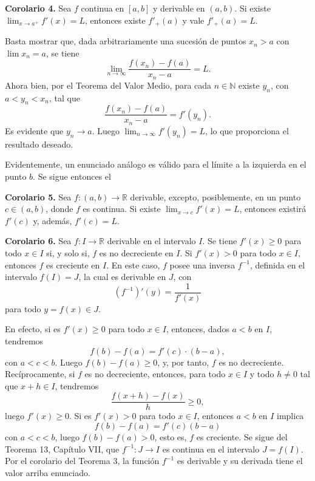 \documentclass[12pt,oneside]{book}
\begin{document}
\textbf{Corolario 4.} Sea \( f \) continua en \( [a, b] \) y derivable en \( (a, b) \). Si existe \( \lim_{x \to a^+} f'(x) = L \), entonces existe \( f'_+(a) \) y vale \( f'_+(a) = L \).

Basta mostrar que, dada arbitrariamente una sucesión de puntos \( x_n > a \) con \( \lim x_n = a \), se tiene
\[
\lim_{n \to \infty} \frac{f(x_n) - f(a)}{x_n - a} = L.
\]
Ahora bien, por el Teorema del Valor Medio, para cada \( n \in \mathbb{N} \) existe \( y_n \), con \( a < y_n < x_n \), tal que
\[
\frac{f(x_n) - f(a)}{x_n - a} = f'(y_n).
\]
Es evidente que \( y_n \to a \). Luego \( \lim_{n \to \infty} f'(y_n) = L \), lo que proporciona el resultado deseado.

Evidentemente, un enunciado análogo es válido para el límite a la izquierda en el punto \( b \). Se sigue entonces el

\textbf{Corolario 5.} Sea \( f: (a, b) \to \mathbb{R} \) derivable, excepto, posiblemente, en un punto \( c \in (a, b) \), donde \( f \) es continua. Si existe \( \lim_{x \to c} f'(x) = L \), entonces existirá \( f'(c) \) y, además, \( f'(c) = L \).

\textbf{Corolario 6.} Sea \( f: I \to \mathbb{R} \) derivable en el intervalo \( I \). Se tiene \( f'(x) \geq 0 \) para todo \( x \in I \) si, y solo si, \( f \) es no decreciente en \( I \). Si \( f'(x) > 0 \) para todo \( x \in I \), entonces \( f \) es creciente en \( I \). En este caso, \( f \) posee una inversa \( f^{-1} \), definida en el intervalo \( f(I) = J \), la cual es derivable en \( J \), con
\[
(f^{-1})'(y) = \frac{1}{f'(x)}
\]
para todo \( y = f(x) \in J \).

En efecto, si es \( f'(x) \geq 0 \) para todo \( x \in I \), entonces, dados \( a < b \) en \( I \), tendremos
\[
f(b) - f(a) = f'(c) \cdot (b - a),
\]
con \( a < c < b \). Luego \( f(b) - f(a) \geq 0 \), y, por tanto, \( f \) es no decreciente. Recíprocamente, si \( f \) es no decreciente, entonces, para todo \( x \in I \) y todo \( h \neq 0 \) tal que \( x + h \in I \), tendremos
\[
\frac{f(x + h) - f(x)}{h} \geq 0,
\]
luego \( f'(x) \geq 0 \). Si es \( f'(x) > 0 \) para todo \( x \in I \), entonces \( a < b \) en \( I \) implica
\[
f(b) - f(a) = f'(c)(b - a)
\]
con \( a < c < b \), luego \( f(b) - f(a) > 0 \), esto es, \( f \) es creciente. Se sigue del Teorema 13, Capítulo VII, que \( f^{-1}: J \to I \) es continua en el intervalo \( J = f(I) \). Por el corolario del Teorema 3, la función \( f^{-1} \) es derivable y su derivada tiene el valor arriba enunciado.
\end{document}
